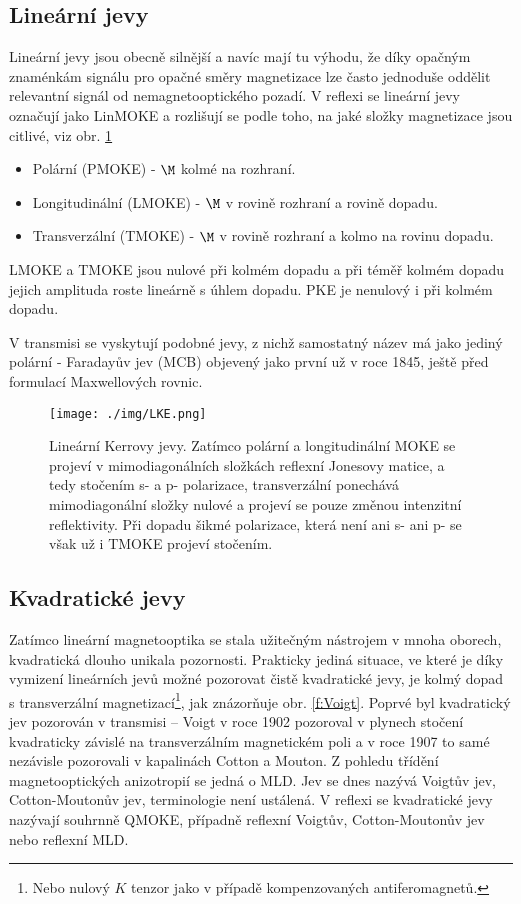 \subsection*{Lineární jevy}

Lineární jevy jsou obecně silnější a navíc mají tu výhodu, že díky opačným znaménkám signálu pro opačné směry magnetizace lze často jednoduše oddělit relevantní signál od nemagnetooptického pozadí.
V reflexi se lineární jevy označují jako LinMOKE a rozlišují se podle toho, na jaké složky magnetizace jsou citlivé, viz obr. \ref{f:KE}
\begin{itemize}
\item Polární (PMOKE) - $\M$ kolmé na rozhraní.
\item Longitudinální (LMOKE) - $\M$ v rovině rozhraní a rovině dopadu.
\item Transverzální (TMOKE) - $\M$ v rovině rozhraní a kolmo na rovinu dopadu.
\end{itemize} 
LMOKE a TMOKE jsou nulové při kolmém dopadu a při téměř kolmém dopadu jejich amplituda roste lineárně s úhlem dopadu. PKE je nenulový i při kolmém dopadu.

V transmisi se vyskytují podobné jevy, z nichž samostatný název má jako jediný polární - Faradayův jev (MCB) objevený jako první už v roce 1845, ještě před formulací Maxwellových rovnic. \cite{ZvezdinKotov}


\begin{figure}\center
\texttt{[image: ./img/LKE.png]}
\caption{Lineární Kerrovy jevy\cite{Silber}. Zatímco polární a longitudinální MOKE se projeví v mimodiagonálních složkách reflexní Jonesovy matice, a tedy stočením s- a p- polarizace, transverzální ponechává mimodiagonální složky nulové a projeví se pouze změnou intenzitní reflektivity. Při dopadu šikmé polarizace, která není ani s- ani p- se však už i TMOKE projeví stočením.}\label{f:KE}
\end{figure}

\subsection*{Kvadratické jevy}

Zatímco lineární magnetooptika se stala užitečným nástrojem v mnoha oborech, kvadratická dlouho unikala pozornosti.
Prakticky jediná situace, ve které je díky vymizení lineárních jevů možné pozorovat čistě kvadratické jevy, je kolmý dopad s transverzální magnetizací\footnote{Nebo nulový $K$ tenzor jako v případě kompenzovaných antiferomagnetů.}, jak znázorňuje obr. \ref{f:Voigt}.
Poprvé byl kvadratický jev pozorován v transmisi -- Voigt v roce 1902 pozoroval v plynech stočení kvadraticky závislé na transverzálním magnetickém poli a v roce 1907 to samé nezávisle pozorovali v kapalinách Cotton a Mouton. \cite{ZvezdinKotov}
Z pohledu třídění magnetooptických anizotropií se jedná o MLD.
Jev se dnes nazývá Voigtův jev, Cotton-Moutonův jev, terminologie není ustálená.
V reflexi se kvadratické jevy nazývají souhrnně QMOKE, případně reflexní Voigtův, Cotton-Moutonův jev nebo reflexní MLD.

